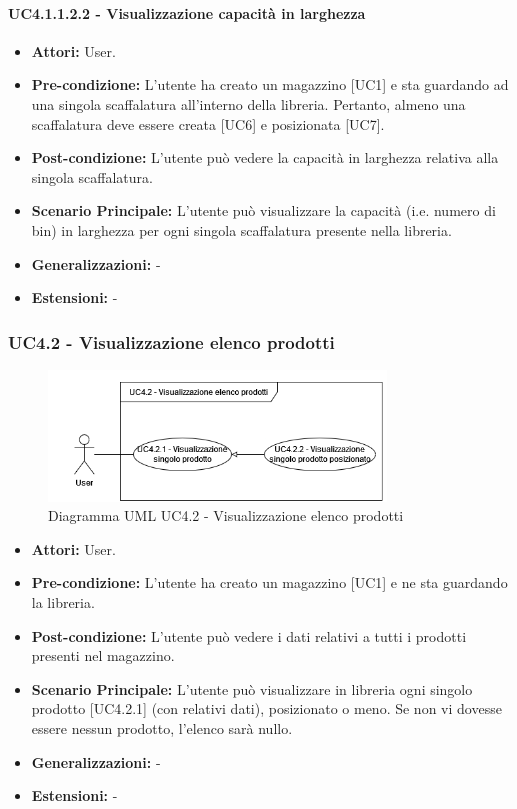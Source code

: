 \paragraph{UC4.1.1.2.2 - Visualizzazione capacità in larghezza}
\begin{itemize}
    \item \textbf{Attori:} User.
    \item \textbf{Pre-condizione:} L'utente ha creato un magazzino [UC1] e sta guardando ad una singola scaffalatura all'interno della libreria. Pertanto, almeno una scaffalatura deve essere creata [UC6] e posizionata [UC7].
    \item \textbf{Post-condizione:} L'utente può vedere la capacità in larghezza relativa alla singola scaffalatura.
    \item \textbf{Scenario Principale:}  L'utente può visualizzare la capacità (i.e. numero di bin) in larghezza per ogni singola scaffalatura presente nella libreria.
    \item \textbf{Generalizzazioni:} -
    \item \textbf{Estensioni:} -
\end{itemize}


\subsubsection{UC4.2 - Visualizzazione elenco prodotti}
\begin{figure}[H]
  \centering
  \includegraphics[width=0.8\textwidth]{UC_diagrams_1-10/UC4.2.drawio.png}
   \caption{Diagramma UML UC4.2 - Visualizzazione elenco prodotti}
\end{figure}
\begin{itemize}
    \item \textbf{Attori:} User.
    \item \textbf{Pre-condizione:}  L'utente ha creato un magazzino [UC1] e ne sta guardando la libreria.
    \item \textbf{Post-condizione:} L'utente può vedere i dati relativi a tutti i prodotti presenti nel magazzino.
    \item \textbf{Scenario Principale:} L'utente può visualizzare in libreria ogni singolo prodotto [UC4.2.1] (con relativi dati), posizionato o meno. Se non vi dovesse essere nessun prodotto, l'elenco sarà nullo.
    \item \textbf{Generalizzazioni:} -
    \item \textbf{Estensioni:} -
\end{itemize}


